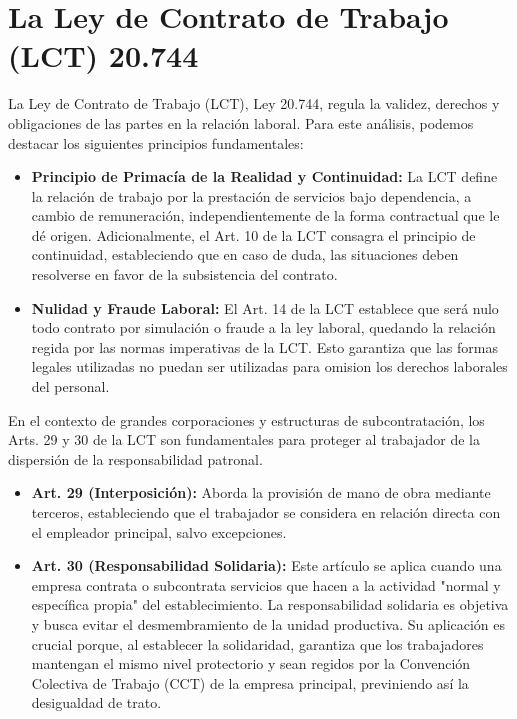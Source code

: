 \documentclass[]{informeutn}
\begin{document}
  \section{La Ley de Contrato de Trabajo (LCT) 20.744}
    La Ley de Contrato de Trabajo (LCT), Ley 20.744, regula la validez, derechos y obligaciones de las partes en la
    relación laboral. Para este análisis, podemos destacar los siguientes principios fundamentales:
    \begin{itemize}
      \item \textbf{Principio de Primacía de la Realidad y Continuidad:} La LCT define la relación de trabajo por la
        prestación de servicios bajo dependencia, a cambio de remuneración, independientemente de la forma contractual
        que le dé origen. Adicionalmente, el Art. 10 de la LCT consagra el principio de continuidad, estableciendo que
        en caso de duda, las situaciones deben resolverse en favor de la subsistencia del contrato.
      \item \textbf{Nulidad y Fraude Laboral:} El Art. 14 de la LCT establece que será nulo todo contrato por simulación
        o fraude a la ley laboral, quedando la relación regida por las normas imperativas de la LCT. Esto garantiza que
        las formas legales utilizadas no puedan ser utilizadas para omision los derechos laborales del personal.
    \end{itemize}

    En el contexto de grandes corporaciones y estructuras de subcontratación, los Arts. 29 y 30 de la LCT son
    fundamentales para proteger al trabajador de la dispersión de la responsabilidad patronal.
    \begin{itemize}
      \item \textbf{Art. 29 (Interposición):} Aborda la provisión de mano de obra mediante terceros, estableciendo que
        el trabajador se considera en relación directa con el empleador principal, salvo excepciones.
      \item \textbf{Art. 30 (Responsabilidad Solidaria):} Este artículo se aplica cuando una empresa contrata o
        subcontrata servicios que hacen a la actividad "normal y específica propia" del establecimiento. La
        responsabilidad solidaria es objetiva y busca evitar el desmembramiento de la unidad productiva. Su aplicación
        es crucial porque, al establecer la solidaridad, garantiza que los trabajadores mantengan el mismo nivel
        protectorio y sean regidos por la Convención Colectiva de Trabajo (CCT) de la empresa principal, previniendo así
        la desigualdad de trato.
    \end{itemize}
\end{document}
